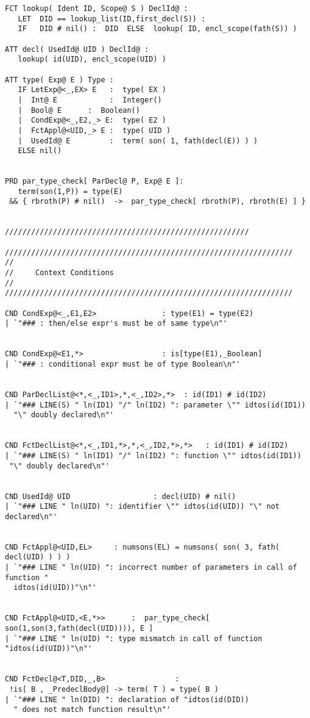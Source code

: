 \begin{verbatim}
FCT lookup( Ident ID, Scope@ S ) DeclId@ :
   LET  DID == lookup_list(ID,first_decl(S)) :
   IF   DID # nil() :  DID  ELSE  lookup( ID, encl_scope(fath(S)) )

ATT decl( UsedId@ UID ) DeclId@ :
   lookup( id(UID), encl_scope(UID) )

ATT type( Exp@ E ) Type :
   IF LetExp@<_,EX> E   :  type( EX )
   |  Int@ E            :  Integer()
   |  Bool@ E      :  Boolean()
   |  CondExp@<_,E2,_> E:  type( E2 ) 
   |  FctAppl@<UID,_> E :  type( UID ) 
   |  UsedId@ E         :  term( son( 1, fath(decl(E)) ) )
   ELSE nil()


PRD par_type_check[ ParDecl@ P, Exp@ E ]:
   term(son(1,P)) = type(E)
 && { rbroth(P) # nil()  ->  par_type_check[ rbroth(P), rbroth(E) ] }
   

////////////////////////////////////////////////////////

//////////////////////////////////////////////////////////////////
//
//     Context Conditions 
//
//////////////////////////////////////////////////////////////////

CND CondExp@<_,E1,E2>               : type(E1) = type(E2)
| `"### : then/else expr's must be of same type\n"'


CND CondExp@<E1,*>                  : is[type(E1),_Boolean] 
| `"### : conditional expr must be of type Boolean\n"'


CND ParDeclList@<*,<_,ID1>,*,<_,ID2>,*>  : id(ID1) # id(ID2)
| `"### LINE(S) " ln(ID1) "/" ln(ID2) ": parameter \"" idtos(id(ID1))
  "\" doubly declared\n"'


CND FctDeclList@<*,<_,ID1,*>,*,<_,ID2,*>,*>   : id(ID1) # id(ID2)
| `"### LINE(S) " ln(ID1) "/" ln(ID2) ": function \"" idtos(id(ID1))
 "\" doubly declared\n"'
 

CND UsedId@ UID                   : decl(UID) # nil()
| `"### LINE " ln(UID) ": identifier \"" idtos(id(UID)) "\" not declared\n"'


CND FctAppl@<UID,EL>     : numsons(EL) = numsons( son( 3, fath( decl(UID) ) ) )
| `"### LINE " ln(UID) ": incorrect number of parameters in call of function "
  idtos(id(UID))"\n"'


CND FctAppl@<UID,<E,*>>      :  par_type_check[ son(1,son(3,fath(decl(UID)))), E ]
| `"### LINE " ln(UID) ": type mismatch in call of function "idtos(id(UID))"\n"'


CND FctDecl@<T,DID,_,B>                :
 !is[ B , _PredeclBody@] -> term( T ) = type( B )
| `"### LINE " ln(DID) ": declaration of "idtos(id(DID))
  " does not match function result\n"'



\end{verbatim}
